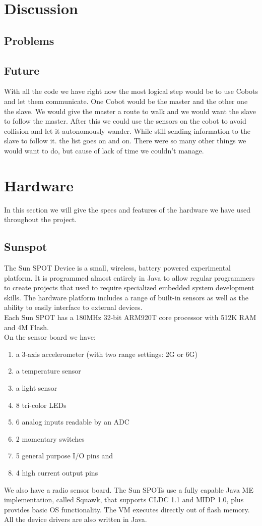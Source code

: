 \documentclass[a4,english]{article}
\begin{document}
\section{Discussion}
\label{sec:discussion}
\subsection{Problems}
\label{subsec:problems}
\subsection{Future}
\label{subsec:future}
With all the code we have right now the most logical step would be to use Cobots and let them communicate. One Cobot would be the master and the other one the slave. We would give the master a route to walk and we would want the slave to follow the master. After this we could use the sensors on the cobot to avoid collision and let it autonomously wander. While still sending information to the slave to follow it. the list goes on and on. There were so many other things we would want to do, but cause of lack of time we couldn't manage. 

\appendix
\section{Hardware}
\label{app:hardware}
In this section we will give the specs and features of the hardware we have used throughout the project. 
\subsection{Sunspot}
\label{app:sunspot}
The Sun SPOT Device is a small, wireless, battery powered experimental platform. It is programmed almost entirely in Java to allow regular programmers to create projects that used to require specialized embedded system development skills. The hardware platform includes a range of built-in sensors as well as the ability to easily interface to external devices. \\
Each Sun SPOT has a 180MHz 32-bit ARM920T core processor with 512K RAM and 4M Flash.\\
On the sensor board we have:
\begin{enumerate}
    \item a 3-axis accelerometer (with two range settings: 2G or 6G)
    \item a temperature sensor
    \item a light sensor
    \item 8 tri-color LEDs
    \item 6 analog inputs readable by an ADC
    \item 2 momentary switches
    \item 5 general purpose I/O pins and
    \item 4 high current output pins	
\end{enumerate}
We also have a radio sensor board.
The Sun SPOTs use a fully capable Java ME implementation, called Squawk, that supports CLDC 1.1 and MIDP 1.0, plus provides basic OS functionality. The VM executes directly out of flash memory. All the device drivers are also written in Java.
\end{document}
